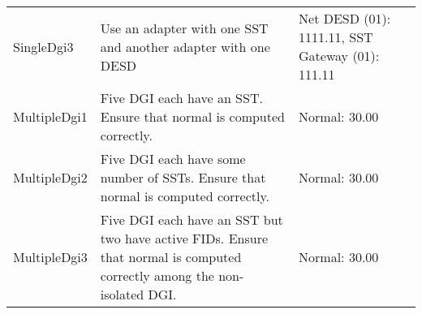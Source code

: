 \documentclass{article}
\begin{document}
\begin{center}
\begin{footnotesize}
\begin{longtable}{|p{3cm}|p{7cm}|p{7cm}|c|}
    SingleDgi3 & Use an adapter with one SST and another adapter with one DESD & Net DESD (01): 1111.11, SST Gateway (01): 111.11 & \\
    MultipleDgi1 & Five DGI each have an SST. Ensure that normal is computed correctly. & Normal: 30.00 & \\
    MultipleDgi2 & Five DGI each have some number of SSTs. Ensure that normal is computed correctly. & Normal: 30.00 & \\
    MultipleDgi3 & Five DGI each have an SST but two have active FIDs. Ensure that normal is computed correctly among the non-isolated DGI. & Normal: 30.00 & \\
\end{longtable}
\end{footnotesize}
\end{center}
\end{document}
